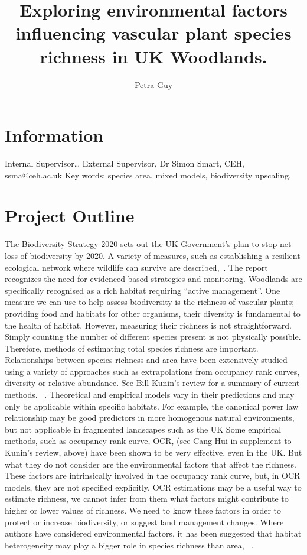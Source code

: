 \documentclass[a4paper]{article}
\title{Exploring environmental factors influencing vascular plant species richness in UK Woodlands.}
\author{Petra Guy}
\begin{document}
\maketitle


\section{Information}

Internal Supervisor…
External Supervisor, Dr Simon Smart, CEH, ssma@ceh.ac.uk
Key words: species area, mixed models, biodiversity upscaling.

\section{Project Outline}

The Biodiversity Strategy 2020 sets out the UK Government’s plan to stop net loss of biodiversity by 2020. A variety of measures, such as establishing a resilient ecological network where wildlife can survive are described,~\cite{DeptEnv}. The report recognizes the need for evidenced based strategies and monitoring. Woodlands are specifically recognised as a rich habitat requiring “active management”. 
One measure we can use to help assess biodiversity is the richness of vascular plants; providing food and habitats for other organisms, their diversity is fundamental to the health of habitat. However, measuring their richness is not straightforward. Simply counting the number of different species present is not physically possible. Therefore, methods of estimating total species richness are important. 
Relationships between species richness and area have been extensively studied using a variety of approaches such as extrapolations from occupancy rank curves, diversity or relative abundance. See Bill Kunin’s review for a summary of current methods. ~\cite{kunin2017up}. Theoretical and empirical models vary in their predictions and may only be applicable within specific habitats. For example, the canonical power law relationship may be good predictors in more homogenous natural environments, but not applicable in fragmented landscapes such as the UK
Some empirical methods, such as occupancy rank curve, OCR, (see Cang Hui in supplement to Kunin’s review, above) have been shown to be very effective, even in the UK. But what they do not consider are the environmental factors that affect the richness. These factors are intrinsically involved in the occupancy rank curve, but, in OCR models, they are not specified explicitly. OCR estimations may be a useful way to estimate richness, we cannot infer from them what factors might contribute to higher or lower values of richness. We need to know these factors in order to protect or increase biodiversity, or suggest land management changes. Where authors have considered environmental factors, it has been suggested that habitat heterogeneity may play a bigger role in species richness than area, ~\cite{JBI:JBI1825, shen2009species}. 
\end{document}
